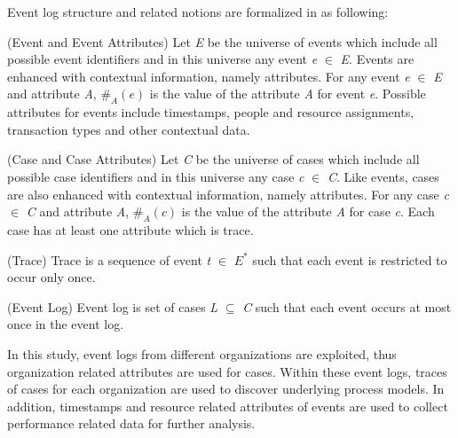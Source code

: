 Event log structure and related notions are formalized in \cite{van2011process} as following:
  \theoremstyle{definition}
  \begin{definition}{}
  (Event and Event Attributes) Let \textit{E} be the universe of events which include all possible event identifiers and in this universe any event \textit{e} $\in$ \textit{E}. Events are enhanced with contextual information, namely attributes. For any event \textit{e} $\in$ \textit{E} and attribute \textit{A}, $\#_\textit{A}(\textit{e})$ is the value of the attribute \textit{A} for event \textit{e}. Possible attributes for events include timestamps, people and resource assignments, transaction types and other contextual data.
  \end{definition}
  \theoremstyle{definition}
  \begin{definition}{}
  (Case and Case Attributes) Let \textit{C} be the universe of cases which include all possible case identifiers and in this universe any case \textit{c} $\in$ \textit{C}. Like events, cases are also enhanced with contextual information, namely attributes. For any case \textit{c} $\in$ \textit{C} and attribute \textit{A}, $\#_\textit{A}(\textit{c})$ is the value of the attribute \textit{A} for case \textit{c}. Each case has at least one attribute which is trace.
  \end{definition}
  \theoremstyle{definition}
  \begin{definition}{}
  (Trace) Trace is a sequence of event \textit{t} $\in$ ${E}^{*}$ such that each event is restricted to occur only once.
  \end{definition}
  \theoremstyle{definition}
  \begin{definition}{}
  (Event Log) Event log is set of cases \textit{L} $\subseteq$ \textit{C} such that each event occurs at most once in the event log.
  \end{definition}

In this study, event logs from different organizations are exploited, thus organization related attributes are used for cases. Within these event logs, traces of cases for each organization are used to discover underlying process models. In addition, timestamps and resource related attributes of events are used to collect performance related data for further analysis.


